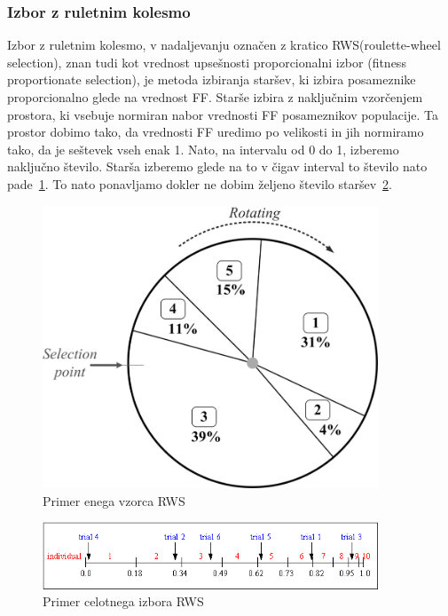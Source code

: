 \documentclass[a4paper, 12pt]{book}
\begin{document}
\subsubsection{Izbor z ruletnim kolesmo}
Izbor z ruletnim kolesmo, v nadaljevanju označen z kratico RWS(roulette-wheel selection), znan tudi kot vrednost upsešnosti proporcionalni izbor (fitness proportionate selection), je metoda izbiranja staršev, ki izbira posameznike proporcionalno glede na vrednost FF. Starše izbira z naključnim vzorčenjem prostora, ki vsebuje normiran nabor vrednosti FF posameznikov populacije. Ta prostor dobimo tako, da vrednosti FF uredimo po velikosti in jih normiramo tako, da je seštevek vseh enak 1. Nato, na intervalu od 0 do 1, izberemo naključno število. Starša izberemo glede na to v čigav interval to število nato pade~\ref{picRWS}. To nato ponavljamo dokler ne dobim željeno število staršev~\ref{picRWS2}.
\begin{figure}[H]
\begin{center}
\includegraphics[width=10cm]{roullett.png}
\end{center}
\caption{Primer enega vzorca RWS}
\label{picRWS}
\end{figure}

\begin{figure}[H]
\begin{center}
\includegraphics[width=10cm]{roullette2.png}
\end{center}
\caption{Primer celotnega izbora RWS}
\label{picRWS2}
\end{figure}
\end{document}
